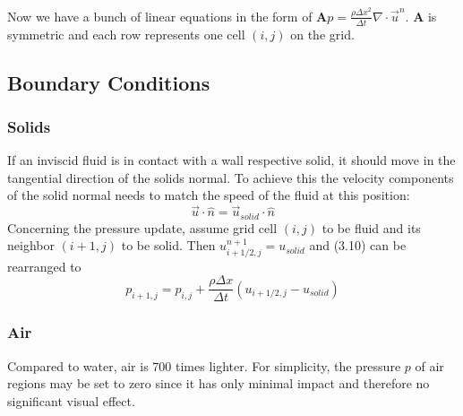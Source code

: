 Now we have a bunch of linear equations in the form of $\mathbf{A}p = \frac{\rho \Delta x^2}{\Delta t}\nabla \cdot \vec{u}^n$. $\mathbf{A}$ is symmetric and each row represents one cell $(i, j)$ on the grid. 


\subsection{Boundary Conditions}
\subsubsection{Solids}
If an inviscid fluid is in contact with a wall respective solid, it should move in the tangential direction of the solids normal. To achieve this the velocity components of the solid normal needs to match the speed of the fluid at this position:
\begin{equation} \label{navier-stokes12}
    \vec{u} \cdot \hat{n} = \vec{u}_{solid} \cdot \hat{n}
\end{equation}
Concerning the pressure update, assume grid cell $(i,j)$ to be fluid and its neighbor $(i+1,j)$ to be solid. Then $u_{i+1/2,j}^{n+1} = u_{solid}$ and (3.10) can be rearranged to 
\begin{equation} \label{navier-stokes12}
    p_{i+1,j} = p_{i,j} + \frac{\rho \Delta x}{\Delta t} (u_{i+1/2,j} - u_{solid})
\end{equation}

\subsubsection{Air}
Compared to water, air is 700 times lighter. For simplicity, the pressure $p$ of air regions may be set to zero since it has only minimal impact and therefore no significant visual effect.

